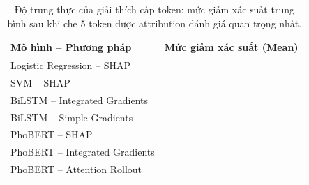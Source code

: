 \begin{table}[h]
  \centering
  \caption[Độ trung thực của giải thích cấp token]{Độ trung thực của giải thích cấp token: mức giảm xác suất trung bình sau khi che 5 token được attribution đánh giá quan trọng nhất.}
  \label{tab:attribution-faithfulness}
  \small
  \setlength{\tabcolsep}{6pt}
  \begin{tabular}{lc}
    \toprule
    \textbf{Mô hình -- Phương pháp} & \textbf{Mức giảm xác suất (Mean)} \\
    \midrule
    Logistic Regression -- SHAP                & \attrfaithfulnesslR{} \\
    SVM -- SHAP                                & \attrfaithfulnesssVM{} \\
    BiLSTM -- Integrated Gradients             & \attrfaithfulnessbilstm{} \\
    BiLSTM -- Simple Gradients                 & \attrfaithfulnessbilstmgrad{} \\
    PhoBERT -- SHAP                            & \attrfaithfulnessphobERTSHAP{} \\
    PhoBERT -- Integrated Gradients            & \attrfaithfulnessphobERTIG{} \\
    PhoBERT -- Attention Rollout               & \attrfaithfulnessphobERTRollout{} \\
    \bottomrule
  \end{tabular}
\end{table}
